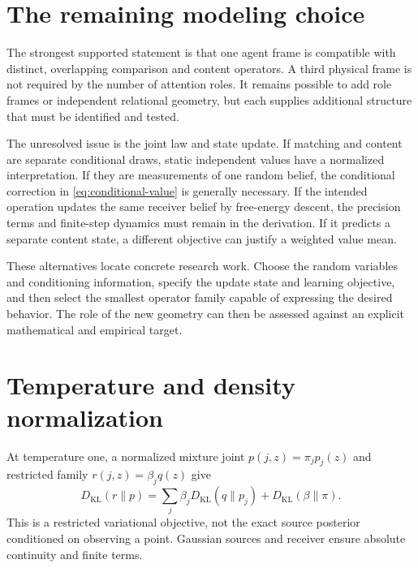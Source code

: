 \documentclass[11pt,letterpaper]{article}
\newcommand{\KL}{D_{\mathrm{KL}}}
\theoremstyle{remark}
\begin{document}
\section{The remaining modeling choice}
The strongest supported statement is that one agent frame is compatible with distinct, overlapping comparison and content operators. A third physical frame is not required by the number of attention roles. It remains possible to add role frames or independent relational geometry, but each supplies additional structure that must be identified and tested.

The unresolved issue is the joint law and state update. If matching and content are separate conditional draws, static independent values have a normalized interpretation. If they are measurements of one random belief, the conditional correction in \eqref{eq:conditional-value} is generally necessary. If the intended operation updates the same receiver belief by free-energy descent, the precision terms and finite-step dynamics must remain in the derivation. If it predicts a separate content state, a different objective can justify a weighted value mean.

These alternatives locate concrete research work. Choose the random variables and conditioning information, specify the update state and learning objective, and then select the smallest operator family capable of expressing the desired behavior. The role of the new geometry can then be assessed against an explicit mathematical and empirical target.

\appendix
\section{Temperature and density normalization}
\label{app:temperature}
At temperature one, a normalized mixture joint $p(j,z)=\pi_jp_j(z)$ and restricted family $r(j,z)=\beta_jq(z)$ give
\begin{equation}
 \KL(r\|p)=\sum_j\beta_j\KL(q\|p_j)+\KL(\beta\|\pi).
\end{equation}
This is a restricted variational objective, not the exact source posterior conditioned on observing a point. Gaussian sources and receiver ensure absolute continuity and finite terms.
\end{document}
